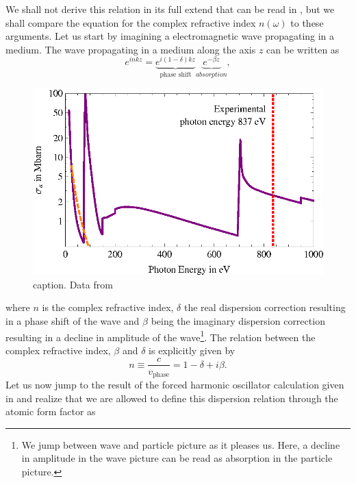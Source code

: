 We shall not derive this relation in its full extend that can be read in \citep[see][p. 55ff]{Attwood-2007-CUP}, but we shall compare the equation for the complex refractive index $n\left(\omega\right)$ to these arguments. Let us start by imagining a electromagnetic wave propagating in a medium. The wave propagating in a medium along the axis $z$ can be written as
\begin{equation}
e^{i n k z}= \underbrace{e^{i \left(1-\delta\right)k z}}_{\text{phase shift}}\underbrace{e^{-\beta z}}_{absorption},
\label{eq:wave-in-medium}
\end{equation}
\begin{figure}
	\centering
		\includegraphics[width=1.00\textwidth]{images/photoionization.eps}
	\caption{caption. Data from \citep{Elettra-2016-Website,Yeh-1985-AtmDat,Yeh-1993-GBSP}}
	\label{fig:photoionization}
\end{figure}
where $n$ is the complex refractive index, $\delta$ the real dispersion correction resulting in a phase shift of the wave and $\beta$ being the imaginary dispersion correction resulting in a decline in amplitude of the wave\footnote{We jump between wave and particle picture as it pleases us. Here, a decline in amplitude in the wave picture can be read as absorption in the particle picture.}. The relation between the complex refractive index, $\beta$ and $\delta$ is explicitly given by
\begin{equation}
n\equiv \frac{c}{v_{\text{phase}}}=1-\delta+i\beta.
\label{eq:complex-refractive-index}
\end{equation}
Let us now jump to the result of the forced harmonic oscillator calculation given in \citep[p.~278]{Als-Nielson-2011-JWS} and realize that we are allowed to define this dispersion relation through the atomic form factor as \citep[see][p.~76]{Als-Nielson-2011-JWS}
